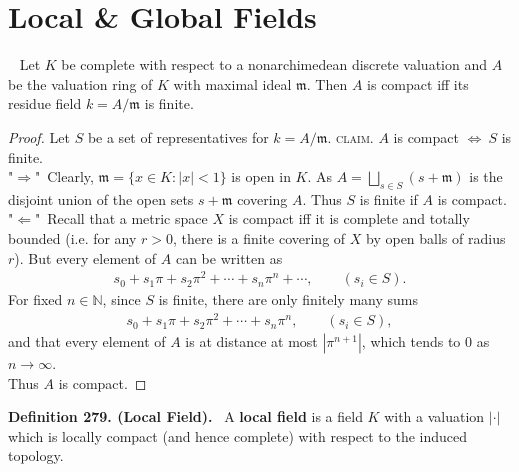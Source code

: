 \documentclass[12pt,a4paper,footinclude=true,headinclude=true]{scrbook} %
\newenvironment{proposition}[2][]
{\renewcommand\theinnercustomprop{#2}\innercustomprop[#1] 
\begin{mdframed}[backgroundcolor=gray!20]\ }
{\end{mdframed}\endinnercustomprop}
\newenvironment{definition}[2][Definition]
    { \begin{mdframed}[backgroundcolor=gray!20] \textbf{#1 #2.}\ }
    {  \end{mdframed}}
\begin{document}
\section{Local \& Global Fields}
\begin{proposition}{278}
    \newline Let $K$ be complete with respect to a nonarchimedean discrete valuation and $A$ be the valuation ring of $K$ with maximal ideal $\mathfrak{m}$. Then $A$ is compact iff its residue field $k=A/\mathfrak{m}$ is finite.
\end{proposition}
\begin{proof}
    Let $S$ be a set of representatives for $k=A/\mathfrak{m}$. \textsc{claim.} $A$ is compact $\Leftrightarrow\ S$ is finite. \\
    "$\Rightarrow$"\ Clearly, $\mathfrak{m}=\{x\in K:|x|<1\}$ is open in $K$. As $A=\bigsqcup_{s\in S}(s+\mathfrak{m})$ is the disjoint union of the open sets $s+\mathfrak{m}$ covering $A$. Thus $S$ is finite if $A$ is compact.\\
    "$\Leftarrow$"\ Recall that a metric space $X$ is compact iff it is complete and totally bounded (i.e. for any $r>0$, there is a finite covering of $X$ by open balls of radius $r$). But every element of $A$ can be written as
    \begin{align*}
        s_0+s_1\pi+s_2\pi^2+\cdots+s_n\pi^n+\cdots,\qquad(s_i\in S).
    \end{align*}
    For fixed $n\in\mathbb{N}$, since $S$ is finite, there are only finitely many sums
    \begin{align*}
        s_0+s_1\pi+s_2\pi^2+\cdots+s_n\pi^n,\qquad(s_i\in S),
    \end{align*}
    and that every element of $A$ is at distance at most $|\pi^{n+1}|$, which tends to $0$ as $n\to\infty$.\\ Thus $A$ is compact.
\end{proof}

\begin{definition}{279. (Local Field)}
    \newline A \textbf{local field} is a field $K$ with a valuation $|\cdot|$ which is locally compact (and hence complete) with respect to the induced topology.
\end{definition}
\end{document}
